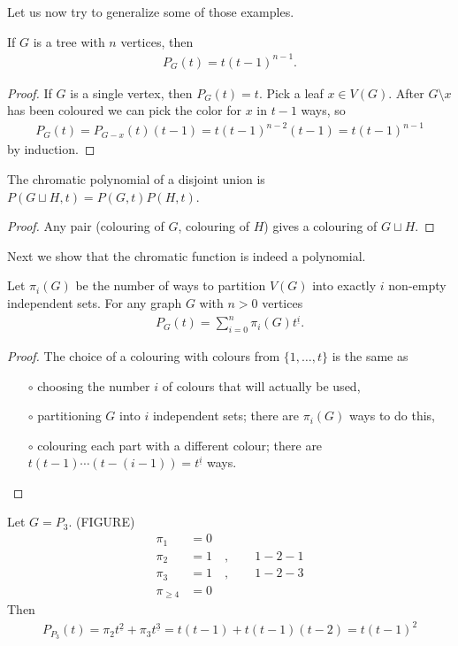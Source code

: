 Let us now try to generalize some of those examples.

\begin{lemma}
If $G$ is a tree with $n$ vertices, then
\begin{align*}
P_G(t)=t(t-1)^{n-1}.
\end{align*}
\end{lemma}
\begin{proof}
If $G$ is a single vertex, then $P_G(t)=t$. Pick a leaf $x\in V(G)$. After $G\setminus x$ has been coloured we can pick the color for $x$ in $t-1$ ways, so
\begin{align*}
P_G(t)=P_{G-x}(t)(t-1) = t(t-1)^{n-2}(t-1)=t(t-1)^{n-1}
\end{align*}
by induction.
\end{proof}

\begin{lemma}
The chromatic polynomial of a disjoint union is $P(G\sqcup H,t)=P(G,t)P(H,t)$.
\end{lemma}
\begin{proof}
Any pair (colouring of $G$, colouring of $H$) gives a colouring of $G\sqcup H$.
\end{proof}

Next we show that the chromatic function is indeed a polynomial.
\begin{proposition}
\label{prop:chromatic-partition}
Let $\pi_i(G)$ be the number of ways to partition $V(G)$ into exactly $i$ non-empty independent sets. For any graph $G$ with $n>0$ vertices
\begin{align*}
P_G(t)=\sum_{i=0}^n \pi_i(G) t^{\underline{i}}.
\end{align*}
\end{proposition}
\begin{proof}
The choice of a colouring with colours from $\lbrace 1,\dots , t\rbrace$ is the same as 
\begin{enumerate}
\item[$\circ$] choosing the number $i$ of colours that will actually be used,
\item[$\circ$] partitioning $G$ into $i$ independent sets; there are $\pi_i(G)$ ways to do this,
\item[$\circ$] colouring each part with a different colour; there are $t(t-1) \cdots  (t-(i-1))=t^{\underline{i}}$ ways.
\end{enumerate}
\end{proof}
\begin{example}
Let $G=P_3$. (FIGURE)
\begin{align*}
\pi_1 &=0\\
\pi_2 &= 1\quad ,\qquad 1-2-1\\
\pi_3 &= 1\quad ,\qquad 1-2-3\\
\pi_{\ge 4} &= 0
\end{align*}
Then
\begin{align*}
P_{P_3}(t)=\pi_2t^{\underline{2}}+\pi_3 t^{\underline{3}}=t(t-1)+t(t-1)(t-2)=t(t-1)^2
\end{align*}
\end{example}

